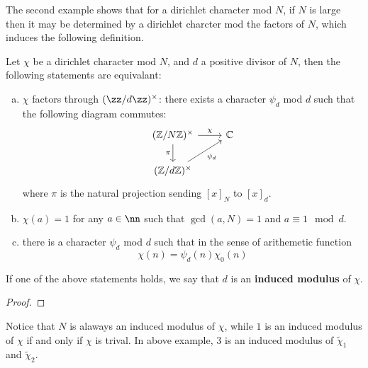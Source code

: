 The second example shows that for a dirichlet character mod \(N\), if \(N\) is large then it may be determined by a dirichlet charcter mod the factors of \(N\), which induces the following definition.

\begin{lemma}
    Let \(\chi\) be a dirichlet character mod \(N\), and \(d \) a positive divisor of \(N\), then the following statements are equivalant:
    \begin{enumerate} [(a)]
        \item \(\chi\) factors through \((\zz/d\zz)^\times\): there exists a character \(\psi_d\) mod \(d\) such that the following diagram commutes:
\[\begin{tikzcd}
	{(\mathbb{Z}/N\mathbb{Z})^\times} & {\mathbb{C}} \\
	{(\mathbb{Z}/d\mathbb{Z})^\times}
	\arrow["\chi", from=1-1, to=1-2]
	\arrow["\pi"', from=1-1, to=2-1]
	\arrow["{\psi_d}"', from=2-1, to=1-2]
\end{tikzcd}\]
        where \(\pi\) is the natural projection sending \([x]_N\) to \([x]_d\).
        \item \(\chi(a) = 1\) for any \(a \in \nn\) such that \(\gcd(a,N) = 1\) and \(a \equiv 1 \mod d\).
        
        \item there is a character \(\psi_d\) mod \(d\) such that in the sense of arithemetic function
        \[\chi(n) = \psi_d(n)\chi_0(n)\]
    \end{enumerate}
    If one of the above statements holds, we say that \(d\) is an \textbf{induced modulus} of \(\chi\).
\end{lemma}

\begin{proof}
    
\end{proof}

\begin{remark}
    Notice that \(N\) is alaways an induced modulus of \(\chi\), while \(1\) is an induced modulus of \(\chi\) if and only if \(\chi\) is trival. In above example, \(3\) is an induced modulus of \(\tilde{\chi}_1\) and \(\tilde{\chi}_2\).
\end{remark}



